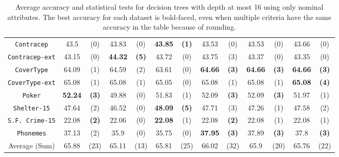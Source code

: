 \begin{table}
\begin{tabular}{c|cc|cc|cc|cc|cc|cc}
{\tt Contracep}     &  43.5        & (0)          &  43.83       & (0)          &  {\bf 43.85} & {\bf (1)}        & 43.53      & (0)          & 43.53      & (0)        & 43.66      & (0)        \\
{\tt Contracep-ext} &  43.15       & (0)          &  {\bf 44.32} & {\bf (5)}    &  43.72       & (0)              & 43.75      & (3)          & 43.37      & (0)        & 43.35      & (0)        \\
{\tt CoverType}     &  64.09       & (1)          &  64.59       & (2)          &  63.61       & (0)              &{\bf 64.66} & {\bf (3)}    & {\bf 64.66}& {\bf (3)}  & {\bf 64.66}& {\bf (3)}  \\
{\tt CoverType-ext} &  65.08       & (1)          &  65.08       & (1)          &  65.05       & (0)              & 65.08      & (1)          & 65.08      & (1)        & {\bf 65.08}& {\bf (4)}  \\
{\tt Poker}         &  {\bf 52.24} & {\bf (3)}    &  49.88       & (0)          &  51.83       & (1)              & 52.09      & {\bf (3)}    & 52.09      & {\bf (3)}  & 51.97      & (1)        \\
{\tt Shelter-15}    &  47.64       & (2)          &  46.52       & (0)          & {\bf 48.09}  & {\bf (5)}        & 47.71      & (3)          & 47.26      & (1)        & 47.58      & (2)        \\
{\tt S.F. Crime-15} &  22.08       & {\bf (2)}    &  22.06       & (0)          & {\bf 22.08}  & (1)              & 22.08      & {\bf (2)}    & 22.08      & (1)        & 22.08      & (1)        \\
{\tt Phonemes}      &  37.13       & (2)          &  35.9        & (0)          & 35.75        & (0)              &{\bf 37.95} & {\bf (3)}    & 37.89      & {\bf (3)}  & 37.8       & {\bf (3)}  \\
\hline
Average (Sum)       &  65.88       & (23)         &  65.11       & (13)         & 65.81        & (25)             &  66.02     & (32)         & 65.9       & (20)       & 65.76      & (22)
\end{tabular}
\normalsize
\caption{Average accuracy and statistical tests  for  decision trees with depth at most 16 using only nominal attributes. The best accuracy for each dataset is bold-faced, even when multiple criteria have the same accuracy in the table because of rounding.}
\label{tab:nominal-16}
\end{table}


